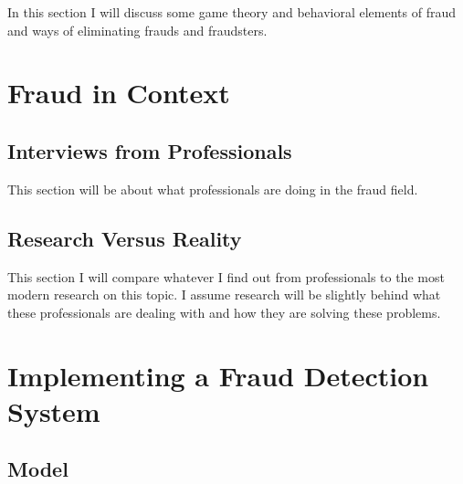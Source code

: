 \documentclass[midd]{thesis}
\begin{document}
In this section I will discuss some game theory and behavioral elements of fraud and ways of eliminating frauds and fraudsters.

\pagebreak


\noindent
%
%

\chapter{ Fraud in Context}
\label{sec:context}

\pagebreak

\section{ Interviews from Professionals}

This section will be about what professionals are doing in the fraud field.

\pagebreak

\section{ Research Versus Reality}
\label{sec:rvr}

This section I will compare whatever I find out from professionals to the most modern research on this topic. I assume research will be slightly behind what these professionals are dealing with and how they are solving these problems.

\pagebreak


\chapter{Implementing a Fraud Detection System}
\pagebreak

\section{Model}
\end{document}
